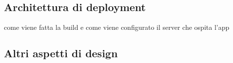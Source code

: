 \subsection{Architettura di deployment}

come viene fatta la build e come viene configurato il server che ospita l'app

\subsection{Altri aspetti di design}
























